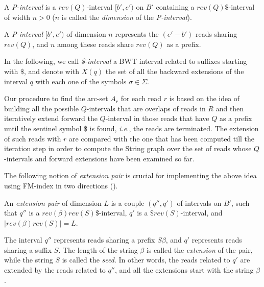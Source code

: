 \documentclass[runningheads,envcountsame,a4paper]{llncs}
\newcommand{\ie}{\textit{i.e.},\xspace}
\begin{document}
\begin{definition}
A \emph{P-interval} is a $rev(Q)$-interval $[b',e')$ on $B'$ containing
a $rev(Q)\$$-interval of width $n>0$ ($n$ is called the \emph{dimension}
of the \emph{P-interval}).
\end{definition}

A \emph{P-interval} $[b',e')$ of dimension $n$ represents the $(e'-b')$
reads sharing $rev(Q)$, and $n$ among these reads share $rev(Q)$ as a
prefix.



In the following, we call \emph{\$-interval} a BWT interval related to
suffixes starting with $\$$, and denote with $X(q)$ the set of all the
backward extensions of the interval $q$ with each one of the symbols
$\sigma \in \Sigma$.


Our procedure to find the arc-set $A_r$ for each read $r$ is based on
the idea of building all the possible $Q$-intervals that are overlaps of
reads in $R$ and then iteratively extend forward the $Q$-interval in
those reads that have $Q$ as a prefix until the sentinel symbol \$ is
found, \ie the reads are terminated.
The extension of such reads with $r$ are compared with the one that has
been computed till the iteration step in order to compute the String
graph over the set of reads whose $Q$-intervals and forward extensions
have been examined so far.

The following notion of \emph{extension pair} is crucial for
implementing the above idea using FM-index in two directions
(\cite{Lam2009}).


\begin{definition}\label{extension-pair}
An \emph{extension pair} of dimension $L$ is a couple $(q'', q')$ of
intervals on $B'$, such that $q''$ is a $rev(\beta)rev(S)\$$-interval,
$q'$ is a $\$rev(S)$-interval, and $|rev(\beta)rev(S)| = L$.
\end{definition}

The interval $q''$ represents reads sharing a prefix $S\beta$, and $q'$
represents reads sharing a suffix $S$.
The length of the string $\beta$ is called the \emph{extension} of the
pair, while the string $S$ is called the \emph{seed}.
In other words, the reads related to $q'$ are extended by the reads
related to $q''$, and all the extensions start with the string $\beta$.
\end{document}
